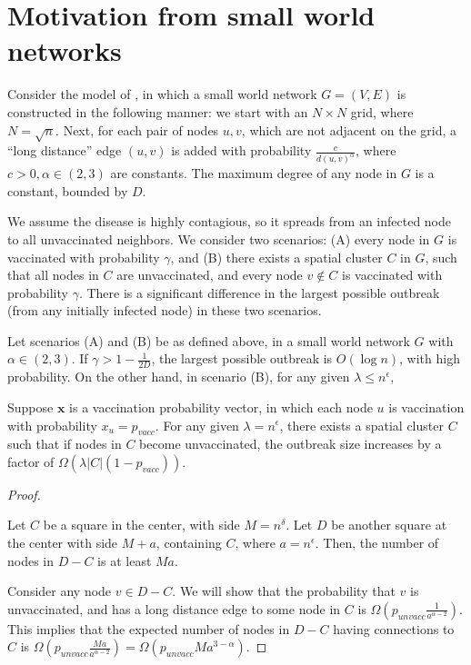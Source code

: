 \section{Motivation from small world networks}
\label{sec:motivation}

\noindent
Consider the model of \cite{kleinberg+smallworld00}, in which a small world network $G=(V, E)$ is constructed
in the following manner: we start with an $N\times N$ grid, where $N=\sqrt{n}$. Next, for each pair of nodes $u, v$, which are not adjacent on the grid,
a ``long distance'' edge $(u, v)$ is added with probability $\frac{c}{d(u, v)^{\alpha}}$, where $c>0, \alpha\in(2, 3)$ are constants. The maximum degree of any node in $G$ is a constant, bounded by $D$.


We assume the disease is highly contagious, so it spreads from an infected node to all unvaccinated neighbors. We consider two scenarios: (A) every node in $G$ is vaccinated with probability $\gamma$, and
(B) there exists a spatial cluster $C$ in $G$, such that all nodes in $C$ are unvaccinated, and every node $v\not\in C$ is vaccinated with probability $\gamma$. There is a significant difference in the largest possible outbreak (from any initially infected node) in these two scenarios.


\begin{lemma}
\label{lemma:sw}
Let scenarios (A) and (B) be as defined above, in a small world network $G$ with $\alpha\in(2, 3)$. If $\gamma > 1-\frac{1}{2D}$, the largest possible outbreak is $O(\log{n})$, with high probability. On the other hand, in scenario (B), for any given $\lambda\leq n^{\epsilon}$,

Suppose $\mathbf{x}$ is a vaccination probability vector, in which each node $u$ is vaccination with probability
$x_u=p_{vacc}$.
For any given $\lambda=n^{\epsilon}$, there exists a spatial cluster $C$ such that if
nodes in $C$ become unvaccinated, the outbreak size increases by a factor of $\Omega(\lambda|C|(1-p_{vacc}))$.
\end{lemma}
\begin{proof}

\cite{Krivelevich2014ThePT}

Let $C$ be a square in the center, with side $M=n^{\delta}$.
Let $D$ be another square at the center with side $M+a$, containing $C$, where $a=n^{\epsilon}$.
Then, the number of nodes in $D-C$ is at least $Ma$.

Consider any node $v\in D-C$. We will show that the probability that $v$ is unvaccinated, and has a long distance edge
to some node in $C$ is $\Omega(p_{unvacc}\frac{1}{a^{\alpha-2}})$. This implies that the expected number of nodes in $D-C$
having connections to $C$ is $\Omega(p_{unvacc}\frac{Ma}{a^{\alpha-2}})=\Omega(p_{unvacc}Ma^{3-\alpha})$.
\end{proof}

